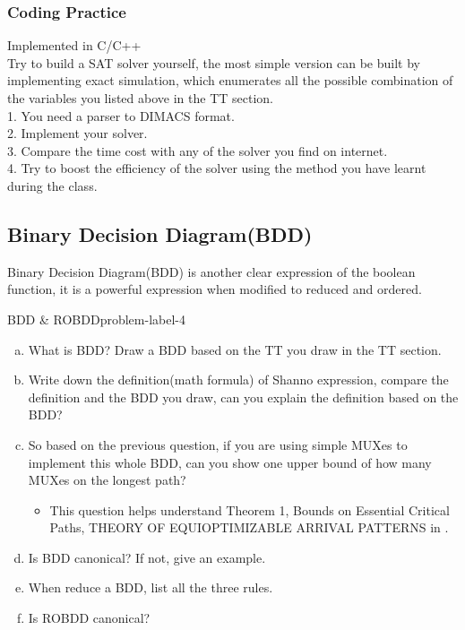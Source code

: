 \documentclass[main.tex]{subfiles}
\begin{document}
\subsubsection{Coding Practice}
Implemented in C/C++\\
Try to build a SAT solver yourself, the most simple version can be built by implementing exact simulation, which enumerates all the possible combination of the variables you listed above in the TT section.\\
1. You need a parser to DIMACS format.\\
2. Implement your solver.\\
3. Compare the time cost with any of the solver you find on internet.\\
4. Try to boost the efficiency of the solver using the method you have learnt during the class.

\subsection{Binary Decision Diagram(BDD)}
Binary Decision Diagram(BDD) is another clear expression of the boolean function, it is a powerful expression when modified to reduced and ordered.
\begin{problem}{BDD \& ROBDD}{problem-label-4}
\begin{enumerate}[(a)]
    \item What is BDD? Draw a BDD based on the TT you draw in the TT section.
    \item Write down the definition(math formula) of Shanno expression, compare the definition and the BDD you draw, can you explain the definition based on the BDD?
    \item So based on the previous question, if you are using simple MUXes to implement this whole BDD, can you show one upper bound of how many MUXes on the longest path?
    \begin{itemize}
        \item This question helps understand Theorem 1, Bounds on Essential Critical Paths, THEORY OF EQUIOPTIMIZABLE ARRIVAL PATTERNS in \cite{EnablingExactDelaySynthesis}.
    \end{itemize}
    \item Is BDD canonical? If not, give an example.
    \item When reduce a BDD, list all the three rules.
    \item Is ROBDD canonical?
\end{enumerate}
\end{problem}
\vspace*{4\baselineskip}
\end{document}
